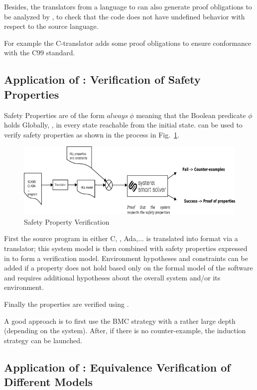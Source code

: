 Besides, the translators from a language to \HLL{} can also generate proof obligations to be analyzed by \smartsolver{},
to check that the code does not have undefined behavior with respect to the source language.

For example the C-translator adds some proof obligations to ensure conformance with the C99 standard.

\subsection{Application of \smartsolver{}: Verification of Safety Properties}
\label{sec:verif-safety-prop}

Safety Properties are of the form $always~\phi$ meaning that the Boolean
predicate $\phi$ holds Globally, \ie{}, in every state reachable from the
initial state. \smartsolver{} can be used to verify safety properties as shown
in the process in Fig.~\ref{fig:s3-safety-prop}.


\begin{figure}[h]
  \centering
  \includegraphics[width=1\textwidth]{figures/s3proof}
  \caption{Safety Property Verification}
  \label{fig:s3-safety-prop}
\end{figure}


First the source program in either \textsc{C}, \SCADE{}, Ada,... is translated
into \HLL{} format via a translator; this \HLL{} system model is then
combined with safety properties expressed in \HLL{} to form a verification
model. 
Environment hypotheses and constraints can be added if a property does not hold 
based  only on the formal model of the software and requires additional
hypotheses about the overall system and/or its environment.

Finally the properties are verified using \smartsolver{}.

A good approach is to first use the BMC strategy with a rather large depth
(depending on the system).
After, if there is no counter-example, the induction strategy can be launched.


\subsection{Application of \smartsolver{}: Equivalence Verification of Different Models}
\label{sec:equiv-verif-diff}

